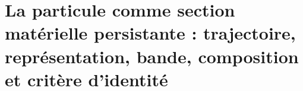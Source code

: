 \chapter{La particule comme section matérielle persistante : trajectoire, représentation, bande, composition et critère d'identité}
\label{chap:md-definicion-particula-definitiva}
\begingroup
\renewcommand{\chapter}[2][]{}%

\endgroup

